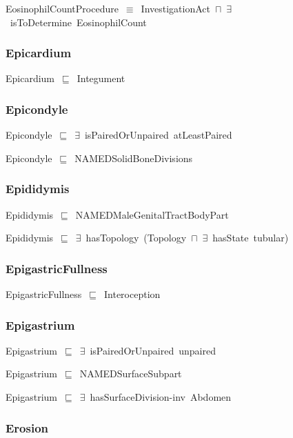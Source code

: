 \documentclass{article}
\begin{document}
EosinophilCountProcedure~\ensuremath{\equiv}~InvestigationAct~\ensuremath{\sqcap}~\ensuremath{\exists}~isToDetermine~EosinophilCount

\subsubsection*{Epicardium}

Epicardium~\ensuremath{\sqsubseteq}~Integument~

\subsubsection*{Epicondyle}

Epicondyle~\ensuremath{\sqsubseteq}~\ensuremath{\exists}~isPairedOrUnpaired~atLeastPaired~

Epicondyle~\ensuremath{\sqsubseteq}~NAMEDSolidBoneDivisions~

\subsubsection*{Epididymis}

Epididymis~\ensuremath{\sqsubseteq}~NAMEDMaleGenitalTractBodyPart~

Epididymis~\ensuremath{\sqsubseteq}~\ensuremath{\exists}~hasTopology~(Topology~\ensuremath{\sqcap}~\ensuremath{\exists}~hasState~tubular)~

\subsubsection*{EpigastricFullness}

EpigastricFullness~\ensuremath{\sqsubseteq}~Interoception~

\subsubsection*{Epigastrium}

Epigastrium~\ensuremath{\sqsubseteq}~\ensuremath{\exists}~isPairedOrUnpaired~unpaired~

Epigastrium~\ensuremath{\sqsubseteq}~NAMEDSurfaceSubpart~

Epigastrium~\ensuremath{\sqsubseteq}~\ensuremath{\exists}~hasSurfaceDivision-inv~Abdomen~

\subsubsection*{Erosion}
\end{document}
